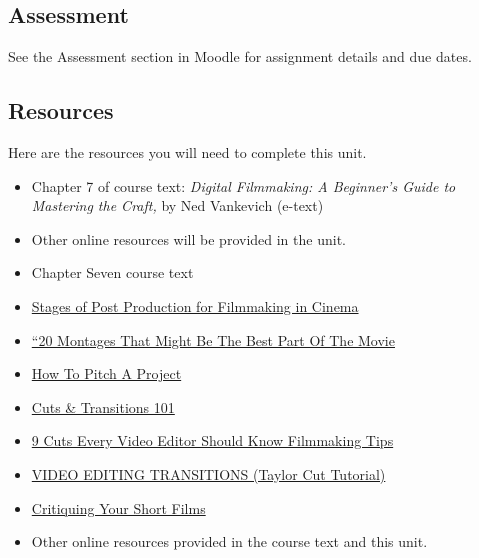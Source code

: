 \documentclass[
]{book}
\begin{document}
\hypertarget{assessment-12}{%
\subsection*{Assessment}\label{assessment-12}}

See the Assessment section in Moodle for assignment details and due dates.

\hypertarget{resources-6}{%
\subsection*{Resources}\label{resources-6}}

Here are the resources you will need to complete this unit.

\begin{itemize}
\item
  Chapter 7 of course text: \emph{Digital Filmmaking: A Beginner's Guide to Mastering the Craft,} by Ned Vankevich (e-text)
\item
  Other online resources will be provided in the unit.
\item
  Chapter Seven course text\\
\item
  \href{https://www.youtube.com/watch?v=IFjyVW21Vpw}{Stages of Post Production for Filmmaking in Cinema}\\
\item
  \href{https://www.refinery29.com/en-us/best-movie-montages}{``20 Montages That Might Be The Best Part Of The Movie}\\
\item
  \href{https://www.youtube.com/watch?v=dak2DkfDTuU}{How To Pitch A Project}\\
\item
  \href{https://www.youtube.com/watch?v=OAH0MoAv2CI\&t=31s}{Cuts \& Transitions 101}\\
\item
  \href{https://www.youtube.com/watch?v=Wv3Hmf2Dxlo}{9 Cuts Every Video Editor Should Know \textbar{} Filmmaking Tips}\\
\item
  \href{https://www.youtube.com/watch?v=bdpbYeoZKnk}{VIDEO EDITING TRANSITIONS (Taylor Cut Tutorial)}\\
\item
  \href{https://www.youtube.com/watch?v=x5ASDkOSIBE}{Critiquing Your Short Films}\\
\item
  Other online resources provided in the course text and this unit.
\end{itemize}
\end{document}
